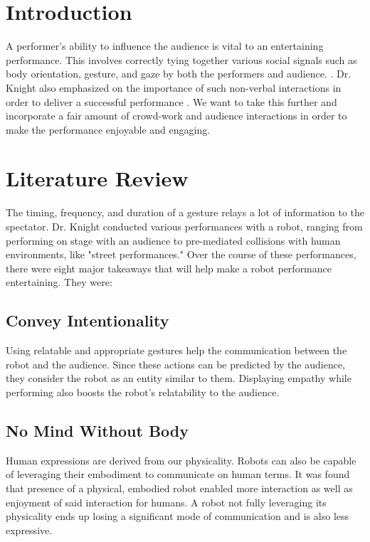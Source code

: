 \documentclass[onecolumn, draftclsnofoot,10pt, compsoc]{IEEEtran}
\begin{document}
\section{Introduction}
A performer's ability to influence the audience is vital to an entertaining performance. This involves correctly tying together various social signals such as body orientation, gesture, and gaze by both the performers and audience. \cite{RobotComedyLab:2015}. Dr. Knight also emphasized on the importance of such non-verbal interactions in order to deliver a successful performance \cite{KnightEightLessons:2011}. We want to take this further and incorporate a fair amount of crowd-work and audience interactions in order to make the performance enjoyable and engaging. 

\section{Literature Review}
The timing, frequency, and duration of a gesture relays a lot of information to the spectator. Dr. Knight conducted various performances with a robot, ranging from performing on stage with an audience to pre-mediated collisions with human environments, like "street performances." Over the course of these performances, there were eight major takeaways that will help make a robot performance entertaining. They were:

\subsection{Convey Intentionality}
Using relatable and appropriate gestures help the communication between the robot and the audience. Since these actions can be predicted by the audience, they consider the robot as an entity similar to them. Displaying empathy while performing also boosts the robot's relatability to the audience.

\subsection{No Mind Without Body}
Human expressions are derived from our physicality. Robots can also be capable of leveraging their embodiment to communicate on human terms. It was found that presence of a physical, embodied robot enabled more interaction as well as enjoyment of said interaction for humans. A robot not fully leveraging its physicality ends up losing a significant mode of communication and is also less expressive.
	
\end{document}
